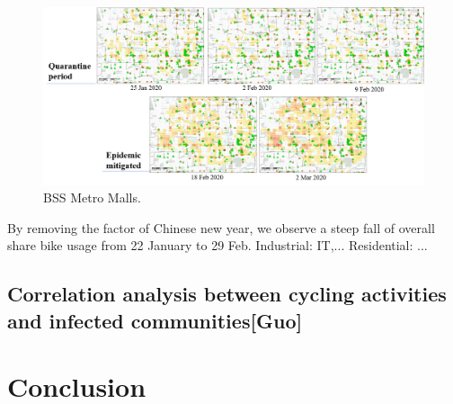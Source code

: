 \documentclass[preprints,ijgi,submit,moreauthors]{Definitions/mdpi}
\begin{document}
\begin{figure}[H]
    \centering
    \includegraphics[width=\textwidth]{Figures/withMetroandMalls.png}
    \caption{BSS Metro Malls.}
    \label{fig:BSS and confirmed cases phase 3}
\end{figure}

By removing the factor of Chinese new year, we observe a steep fall of overall share bike usage from 22 January to 29 Feb.
Industrial: IT,...
Residential: ...


\subsection{Correlation analysis between cycling activities and infected communities\textbf{[Guo]}}

\section{Conclusion}


\vspace{6pt} 



\appendix
\end{document}

